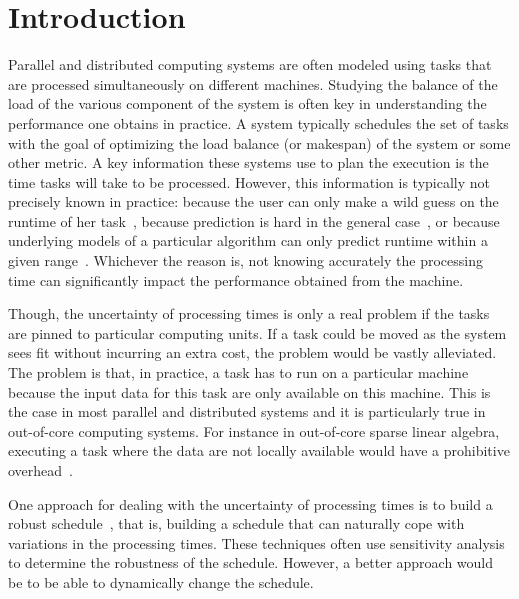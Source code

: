\documentclass[10pt, conference, compsocconf]{IEEEtran}
\begin{document}
\IEEEpeerreviewmaketitle

\section{Introduction}

Parallel and distributed computing systems are often modeled using
tasks that are processed simultaneously on different
machines. Studying the balance of the load of the various component of
the system is often key in understanding the performance one obtains
in practice. A system typically schedules the set of tasks with the
goal of optimizing the load balance (or makespan) of the system or
some other metric. A key information these systems use to plan the
execution is the time tasks will take to be processed. However, this
information is typically not precisely known in practice: because the
user can only make a wild guess on the runtime of her
task~\cite{Luong2008}, because prediction is hard in the general
case~\cite{Wilhelm2008}, or because underlying models of a particular
algorithm can only predict runtime within a given
range~\cite{Erlebacher14-ICS}. Whichever the reason is, not knowing
accurately the processing time can significantly impact the
performance obtained from the machine.

Though, the uncertainty of processing times is only a real problem if
the tasks are pinned to particular computing units. If a task could
be moved as the system sees fit without incurring an extra cost, the
problem would be vastly alleviated. The problem is that, in practice,
a task has to run on a particular machine because the input data for
this task are only available on this machine. This is the case in most
parallel and distributed systems and it is particularly true in
out-of-core computing systems. For instance in out-of-core sparse
linear algebra, executing a task where the data are not locally
available would have a prohibitive
overhead~\cite{Zhou12-Cluster,Zhou12-P2S2}.

One approach for dealing with the uncertainty of processing times is to
build a robust schedule~\cite{cj09c,Gatto07,
  Davenport_slack-basedtechniques}, that is, building a schedule that
can naturally cope with variations in the processing times. These
techniques often use sensitivity analysis to determine the robustness
of the schedule. However, a better approach would be to be able to
dynamically change the schedule. 
\end{document}
